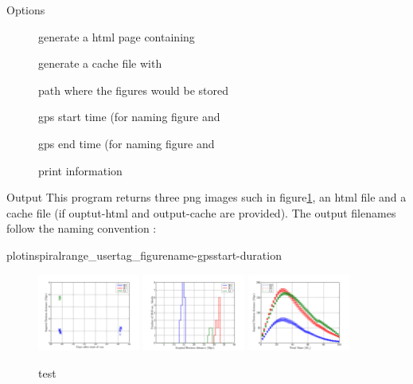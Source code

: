 \begin{manpage}{}
\begin{mansection}{Options}
\begin{description}
\item[] generate a html page containing
\item[] generate a cache file with
\item[]     path where the figures would be stored
\item[]    gps start time (for naming figure and
\item[]   gps end time (for naming figure and
\item[] print information   
\end{description}
\end{mansection}


\begin{mansection}{Output}
This program returns three png images such in
figure\ref{fig:lalapps_plotinspiralrange}, an html file and a cache file (if
ouptut-html and output-cache are provided). The output filenames follow the
naming convention : 

plotinspiralrange\_usertag\_figurename-gpsstart-duration


\begin{figure}[ht]
{\includegraphics[width=0.30\textwidth]{./plotinspiralrange_playground_range_plot-849974770-2419200.png}}
{\includegraphics[width=0.30\textwidth]{./plotinspiralrange_playground_range_hist-849974770-2419200.png}}
{\includegraphics[width=0.30\textwidth]{./plotinspiralrange_playground_range_mass-849974770-2419200.png}}
\caption{\label{fig:lalapps_plotinspiralrange} test}
\end{figure}
\end{mansection}


\end{manpage}
